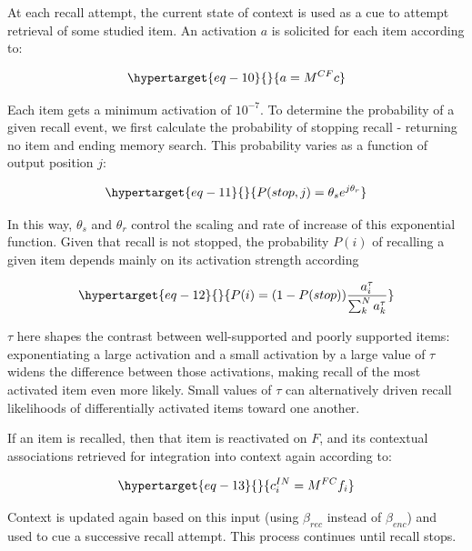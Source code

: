 \documentclass[
  letterpaper,
  DIV=11]{article}
\begin{document}
At each recall attempt, the current state of context is used as a cue to
attempt retrieval of some studied item. An activation \(a\) is solicited
for each item according to:

\begin{equation}\protect\hypertarget{eq-10}{}{ 
a = M^{CF}c
}\label{eq-10}\end{equation}

Each item gets a minimum activation of \(10^{-7}\). To determine the
probability of a given recall event, we first calculate the probability
of stopping recall - returning no item and ending memory search. This
probability varies as a function of output position \(j\):

\begin{equation}\protect\hypertarget{eq-11}{}{
P(stop, j) = \theta_se^{j\theta_r}
}\label{eq-11}\end{equation}

In this way, \(\theta_s\) and \(\theta_r\) control the scaling and rate
of increase of this exponential function. Given that recall is not
stopped, the probability \(P(i)\) of recalling a given item depends
mainly on its activation strength according

\begin{equation}\protect\hypertarget{eq-12}{}{
P(i) = (1-P(stop))\frac{a^{\tau}_i}{\sum_{k}^{N}a^{\tau}_k}
}\label{eq-12}\end{equation}

\(\tau\) here shapes the contrast between well-supported and poorly
supported items: exponentiating a large activation and a small
activation by a large value of \(\tau\) widens the difference between
those activations, making recall of the most activated item even more
likely. Small values of \(\tau\) can alternatively driven recall
likelihoods of differentially activated items toward one another.

If an item is recalled, then that item is reactivated on \(F\), and its
contextual associations retrieved for integration into context again
according to:

\begin{equation}\protect\hypertarget{eq-13}{}{
c^{IN}_{i} = M^{FC}f_{i}
}\label{eq-13}\end{equation}

Context is updated again based on this input (using \(\beta_{rec}\)
instead of \(\beta_{enc}\)) and used to cue a successive recall attempt.
This process continues until recall stops.
\end{document}
